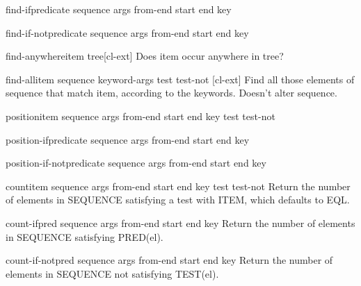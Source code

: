\documentclass[10pt,english]{book}
\begin{document}
\begin{function}{find-if}{predicate sequence \rest args \key from-end start end key}
  
\end{function}

\begin{function}{find-if-not}{predicate sequence \rest args \key from-end start end key}
  
\end{function}

\begin{function}{find-anywhere}{item tree}[cl-ext]
  Does item occur anywhere in tree?
\end{function}

\begin{function}{find-all}{item sequence \rest keyword-args \key test test-not \akeys}[cl-ext]
  Find all those elements of sequence that match item, according to
  the keywords. Doesn't alter sequence.
\end{function}

\begin{function}{position}{item sequence \rest args \key from-end start end key test test-not}
  
\end{function}

\begin{function}{position-if}{predicate sequence \rest args \key from-end start end key}
  
\end{function}

\begin{function}{position-if-not}{predicate sequence \rest args \key from-end start end key}
  
\end{function}

\begin{function}{count}{item sequence \rest args \key from-end start end key test test-not}
  Return the number of elements in SEQUENCE satisfying a test with ITEM,
  which defaults to EQL.
\end{function}

\begin{function}{count-if}{pred sequence \rest args \key from-end start end key}
  Return the number of elements in SEQUENCE satisfying PRED(el).
\end{function}

\begin{function}{count-if-not}{pred sequence \rest args \key from-end start end key}
  Return the number of elements in SEQUENCE not satisfying TEST(el).
\end{function}
\end{document}
